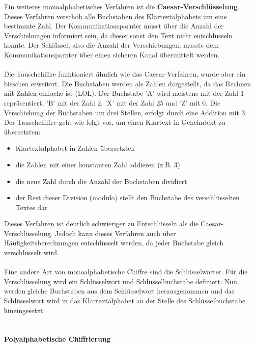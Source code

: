 \documentclass[11pt,a4paper]{report}
\begin{document}
Ein weiteres monoalphabetisches Verfahren ist die \textbf{Caesar-Verschlüsselung}. Dieses Verfahren verschob alle Buchstaben des Klartextalphabets um eine bestimmte Zahl. Der Kommunikationsparnter musst über die Anzahl der Verschiebungen informiert sein, da dieser sonst den Text nicht entschlüsseln konnte. Der Schlüssel, also die Anzahl der Verschiebungen, musste dem Kommunikationsparnter über einen sicheren Kanal übermittelt werden.\\\\

Die Tauschchiffre funktioniert ähnlich wie das Caesar-Verfahren, wurde aber ein bisschen erweitert. Die Buchstaben werden als Zahlen dargestellt, da das Rechnen mit Zahlen einfache ist (LOL). Der Buchstabe 'A' wird meistens mit der Zahl 1 repräsentiert, 'B' mit der Zahl 2, 'X' mit der Zahl 25 und 'Z' mit 0. Die Verschiebung der Buchstaben um drei Stellen, erfolgt durch eine Addition mit 3. Der Tauschchiffre geht wie folgt vor, um einen Klartext in Geheimtext zu übersetzten:

\begin{itemize}
  \item Klartextalphabet in Zahlen übersetzten
  \item die Zahlen mit einer konstanten Zahl addieren (z.B. 3)
  \item die neue Zahl durch die Anzahl der Buchstaben dividiert
  \item der Rest dieser Division (modulo) stellt den Buchstabe des verschlüsselten Textes dar
\end{itemize}

Dieses Verfahren ist deutlich schwieriger zu Entschlüsseln als die Caesar-Verschlüsselung. Jedoch kann dieses Verfahren auch über Häufigkeitsberechnungen entschlüsselt werden, da jeder Buchstabe gleich verschlüsselt wird.\\\\

Eine andere Art von monoalphabetische Chiffre sind die Schlüsselwörter. Für die Verschlüsselung wird ein Schlüsselwort und Schlüsselbuchstabe definiert. Nun werden gleiche Buchstaben aus dem Schlüsselwort herausgenommen und das Schlüsselwort wird in das Klartextalphabet an der Stelle des Schlüsselbuchstabe hineingesetzt. \\\\

\paragraph{Polyalphabetische Chiffrierung}
\end{document}
